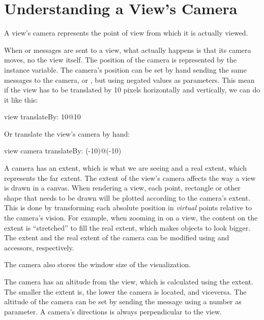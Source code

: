 \documentclass[a4paper,10pt,twoside]{book}
\begin{document}



\section{Understanding a View's Camera} 

A view's camera represents the point of view from which it is actually viewed. 

When  or  messages are sent to a view, what actually happens is that its camera moves, no the view itself. The position of the camera is represented by the  instance variable. The camera's position can be set by hand sending the same messages to the camera,  or , but using negated values as parameters. This mean if the view has to be translated by 10 pixels horizontally and vertically, we can do it like this:

\begin{code}{}
view translateBy: 10@10
\end{code}

Or translate the view's camera by hand:

\begin{code}{}
view camera translateBy: (-10)@(-10)
\end{code}

A camera has an extent, which is what we are seeing and a real extent, which represents the far extent. 
The extent of the view's camera affects the way a view is drawn in a canvas. When rendering a view, each point, rectangle or other shape that needs to be drawn will be plotted according to the camera's extent. This is done by transforming each absolute position in \emph{virtual} points relative to the camera's vision.
For example, when zooming in on a view, the content on the extent is ``stretched'' to fill the real extent, which makes objects to look bigger.  
The extent and the real extent of the camera can be modified using  and  accessors, respectively.

The camera also stores the window size of the visualization.

The camera has an altitude from the view, which is calculated using the extent. The smaller the extent is, the lower the camera is located, and viceversa. The altitude of the camera can be set by sending the  message using a number as parameter.
A camera's directions is always perpendicular to the view.
\end{document}
